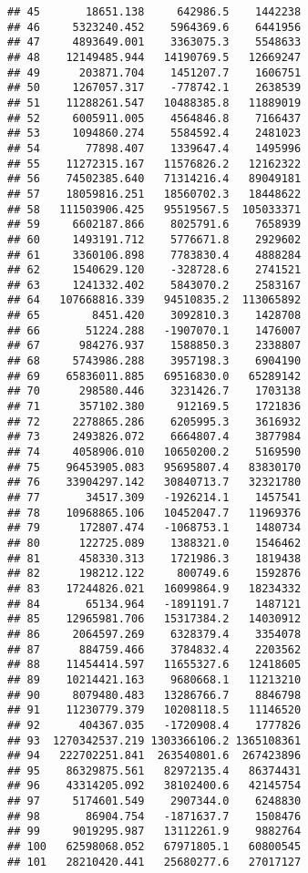 \documentclass[
]{article}
\begin{document}
\begin{verbatim}
## 45       18651.138     642986.5    1442238
## 46     5323240.452    5964369.6    6441956
## 47     4893649.001    3363075.3    5548633
## 48    12149485.944   14190769.5   12669247
## 49      203871.704    1451207.7    1606751
## 50     1267057.317    -778742.1    2638539
## 51    11288261.547   10488385.8   11889019
## 52     6005911.005    4564846.8    7166437
## 53     1094860.274    5584592.4    2481023
## 54       77898.407    1339647.4    1495996
## 55    11272315.167   11576826.2   12162322
## 56    74502385.640   71314216.4   89049181
## 57    18059816.251   18560702.3   18448622
## 58   111503906.425   95519567.5  105033371
## 59     6602187.866    8025791.6    7658939
## 60     1493191.712    5776671.8    2929602
## 61     3360106.898    7783830.4    4888284
## 62     1540629.120    -328728.6    2741521
## 63     1241332.402    5843070.2    2583167
## 64   107668816.339   94510835.2  113065892
## 65        8451.420    3092810.3    1428708
## 66       51224.288   -1907070.1    1476007
## 67      984276.937    1588850.3    2338807
## 68     5743986.288    3957198.3    6904190
## 69    65836011.885   69516830.0   65289142
## 70      298580.446    3231426.7    1703138
## 71      357102.380     912169.5    1721836
## 72     2278865.286    6205995.3    3616932
## 73     2493826.072    6664807.4    3877984
## 74     4058906.010   10650200.2    5169590
## 75    96453905.083   95695807.4   83830170
## 76    33904297.142   30840713.7   32321780
## 77       34517.309   -1926214.1    1457541
## 78    10968865.106   10452047.7   11969376
## 79      172807.474   -1068753.1    1480734
## 80      122725.089    1388321.0    1546462
## 81      458330.313    1721986.3    1819438
## 82      198212.122     800749.6    1592876
## 83    17244826.021   16099864.9   18234332
## 84       65134.964   -1891191.7    1487121
## 85    12965981.706   15317384.2   14030912
## 86     2064597.269    6328379.4    3354078
## 87      884759.466    3784832.4    2203562
## 88    11454414.597   11655327.6   12418605
## 89    10214421.163    9680668.1   11213210
## 90     8079480.483   13286766.7    8846798
## 91    11230779.379   10208118.5   11146520
## 92      404367.035   -1720908.4    1777826
## 93  1270342537.219 1303366106.2 1365108361
## 94   222702251.841  263540801.6  267423896
## 95    86329875.561   82972135.4   86374431
## 96    43314205.092   38102400.6   42145754
## 97     5174601.549    2907344.0    6248830
## 98       86904.754   -1871637.7    1508476
## 99     9019295.987   13112261.9    9882764
## 100   62598068.052   67971805.1   60800545
## 101   28210420.441   25680277.6   27017127

\end{verbatim}
\end{document}
